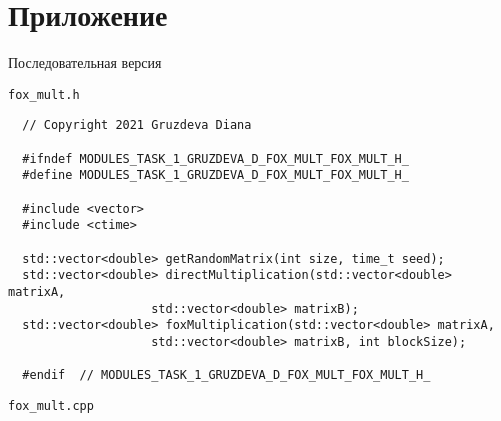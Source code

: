 \documentclass{article}
\begin{document}
\section*{Приложение}
\par
Последовательная версия
\par
\lstinline$fox_mult.h$
\begin{lstlisting}
  // Copyright 2021 Gruzdeva Diana

  #ifndef MODULES_TASK_1_GRUZDEVA_D_FOX_MULT_FOX_MULT_H_
  #define MODULES_TASK_1_GRUZDEVA_D_FOX_MULT_FOX_MULT_H_

  #include <vector>
  #include <ctime>

  std::vector<double> getRandomMatrix(int size, time_t seed);
  std::vector<double> directMultiplication(std::vector<double> matrixA,
                    std::vector<double> matrixB);
  std::vector<double> foxMultiplication(std::vector<double> matrixA,
                    std::vector<double> matrixB, int blockSize);

  #endif  // MODULES_TASK_1_GRUZDEVA_D_FOX_MULT_FOX_MULT_H_
\end{lstlisting}
\par
\lstinline$fox_mult.cpp$
\end{document}
